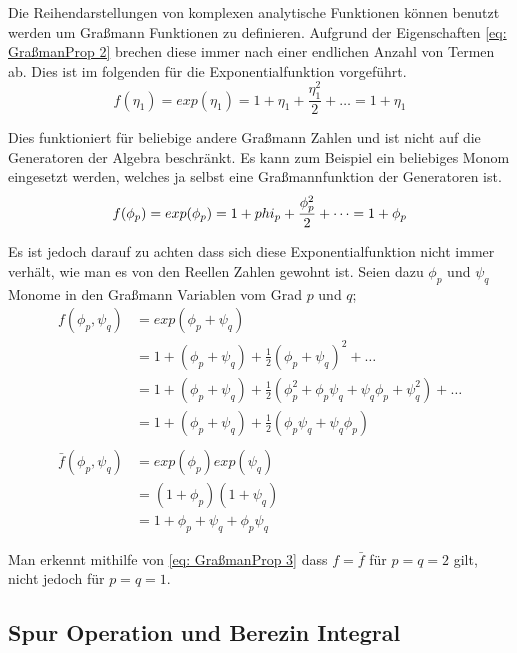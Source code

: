 \noindent Die Reihendarstellungen von komplexen analytische Funktionen können benutzt werden um Graßmann Funktionen zu definieren. Aufgrund der Eigenschaften \eqref{eq: GraßmanProp 2} brechen diese immer nach einer endlichen Anzahl von Termen ab. Dies ist im folgenden für die Exponentialfunktion vorgeführt. 
\begin{equation} \label{eq: exp()}
    f(\eta_1) = exp(\eta_1) = 1 + \eta_1 + \frac{\eta_1^2}{2} + \dots = 1 + \eta_1
\end{equation}

\noindent Dies funktioniert für beliebige andere Graßmann Zahlen und ist nicht auf die Generatoren der Algebra beschränkt. Es kann zum Beispiel ein beliebiges Monom eingesetzt werden, welches ja selbst eine Graßmannfunktion der Generatoren ist. 
\begin{equation} \label{eq: exp()}
    f(\phi_p) = exp(\phi_p) = 1 + \\phi_p + \frac{\phi_p^2}{2} + \dots = 1 + \phi_p
\end{equation}

\noindent Es ist jedoch darauf zu achten dass sich diese Exponentialfunktion nicht immer verhält, wie man es von den Reellen Zahlen gewohnt ist. Seien dazu $\phi_p$ und $\psi_q$ Monome in den Graßmann Variablen vom Grad $p$ und $q$; 
\begin{align}
    f(\phi_p, \psi_q) 
        &= exp(\phi_p + \psi_q) \nonumber \\
        &= 1 + (\phi_p + \psi_q) + \frac{1}{2}(\phi_p + \psi_q)^2 + \dots \nonumber\\
        &= 1 + (\phi_p + \psi_q) + \frac{1}{2}(\phi_p^2 + \phi_p\psi_q +\psi_q\phi_p + \psi_q^2) + \dots \nonumber\\
     &= 1 + (\phi_p + \psi_q) + \frac{1}{2}( \phi_p\psi_q +\psi_q\phi_p) \\
    \nonumber \\
    \bar{f}(\phi_p, \psi_q) 
        &= exp(\phi_p) exp(\psi_q) \nonumber \\
        &= (1 + \phi_p)(1 +\psi_q) \nonumber \\
    &= 1+  \phi_p + \psi_q + \phi_p\psi_q 
\end{align}

\noindent Man erkennt mithilfe von \eqref{eq: GraßmanProp 3} dass $f = \bar f$ für $p=q = 2$ gilt, nicht jedoch für $ p = q = 1 $.

\subsection{Spur Operation und Berezin Integral}

